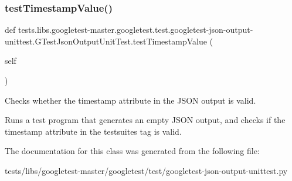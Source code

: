 \subsubsection{\texorpdfstring{test\+Timestamp\+Value()}{testTimestampValue()}}
{\footnotesize\ttfamily def tests.\+libs.\+googletest-\/master.\+googletest.\+test.\+googletest-\/json-\/output-\/unittest.\+G\+Test\+Json\+Output\+Unit\+Test.\+test\+Timestamp\+Value (\begin{DoxyParamCaption}\item[{}]{self }\end{DoxyParamCaption})}

\begin{DoxyVerb}Checks whether the timestamp attribute in the JSON output is valid.

Runs a test program that generates an empty JSON output, and checks if
the timestamp attribute in the testsuites tag is valid.
\end{DoxyVerb}
 

The documentation for this class was generated from the following file\+:\begin{DoxyCompactItemize}
\item 
tests/libs/googletest-\/master/googletest/test/googletest-\/json-\/output-\/unittest.\+py\end{DoxyCompactItemize}
